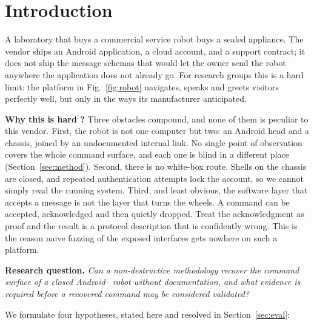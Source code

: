 
\section{Introduction}
\label{sec:intro}

A laboratory that buys a commercial service robot buys a sealed appliance. The vendor ships an
Android application, a cloud account, and a support contract; it does not ship the message
schemas that would let the owner send the robot anywhere the application does not already go.
For research groups this is a hard limit: the platform in Fig.~\ref{fig:robot} navigates,
speaks and greets visitors perfectly well, but only in the ways its manufacturer anticipated.



\textbf{Why this is hard ?} Three obstacles compound, and none of them is peculiar to this
vendor. First, the robot is not one computer but two: an Android head and a \ros{} chassis,
joined by an undocumented internal link. No single point of observation covers the whole command
surface, and each one is blind in a different place (Section~\ref{sec:method}). Second, there is
no white-box route. Shells on the chassis are closed, and repeated authentication attempts lock
the account, so we cannot simply read the running system. Third, and least obvious, the software
layer that accepts a message is not the layer that turns the wheels. A command can be accepted,
acknowledged and then quietly dropped. Treat the acknowledgment as proof and the result is a
protocol description that is confidently wrong. This is the reason naive fuzzing of the exposed
interfaces gets nowhere on such a platform.

\textbf{Research question.} \emph{Can a non-destructive methodology recover the command surface
of a closed Android--\ros{} robot without documentation, and what evidence is required before a
recovered command may be considered validated?}

We formulate four hypotheses, stated here and resolved in Section~\ref{sec:eval}:

